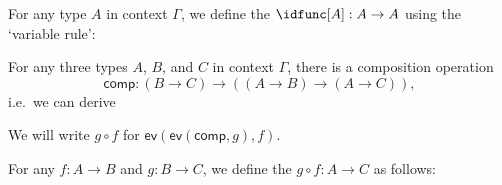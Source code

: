 \begin{prooftree}
\end{prooftree}
\begin{prooftree}
\end{prooftree}
\begin{prooftree}
\end{prooftree}
\begin{prooftree}
\end{prooftree}
\begin{prooftree}
\end{prooftree}

\begin{defn}
For any type $A$ in context $\Gamma$, we define the  $\idfunc[A]:A\to A$ using the `variable rule':
\begin{prooftree}
\end{prooftree}
\end{defn}

\begin{defn}
For any three types $A$, $B$, and $C$ in context $\Gamma$, there is a composition operation
\begin{equation*}
\mathsf{comp}:(B\to C)\to ((A\to B)\to (A\to C)),
\end{equation*}
i.e.~we can derive
\begin{prooftree}
\end{prooftree}
We will write $g\circ f$ for $\mathsf{ev}(\mathsf{ev}(\mathsf{comp},g),f)$.
\end{defn}

\begin{defn}
For any $f:A\to B$ and $g:B\to C$, we define the  $g\circ f:A\to C$ as follows:
\begin{prooftree}
\end{prooftree}
\end{defn}

